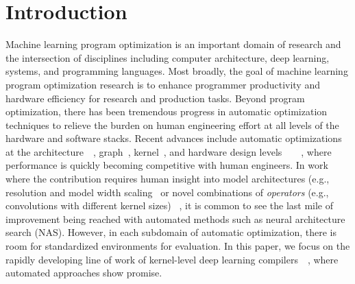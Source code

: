 \section{Introduction}
Machine learning program optimization is an important domain of research and the intersection of disciplines including computer architecture, deep learning, systems, and programming languages.
Most broadly, the goal of machine learning program optimization research is to enhance programmer productivity and hardware efficiency for research and production tasks.
Beyond program optimization, there has been tremendous progress in automatic optimization techniques to relieve the burden on human engineering effort at all levels of the hardware and software stacks.
Recent advances include automatic optimizations at the architecture~\cite{liu2018darts}~\cite{zoph2018learning}, graph~\cite{metaflow_sysml19}, kernel~\cite{NIPS2018_7599}, and hardware design levels~\cite{Koeplinger:2016:AGE:3007787.3001150}~\cite{koeplinger2018spatial}~\cite{moreau2019hardware}~\cite{8009208}, where performance is quickly becoming competitive with human engineers.
In work where the contribution requires human insight into model architectures (e.g., resolution and model width scaling~\cite{tan2019efficientnet} or novel combinations of \emph{operators} (e.g., convolutions with different kernel sizes) ~\cite{tan2019mixnet}, it is common to see the last mile of improvement being reached with automated methods such as neural architecture search (NAS).
However, in each subdomain of automatic optimization, there is room for standardized environments for evaluation.
In this paper, we focus on the rapidly developing line of work of kernel-level deep learning compilers~\cite{xing2019dnnvm}~\cite{222575}, where automated approaches show promise.

